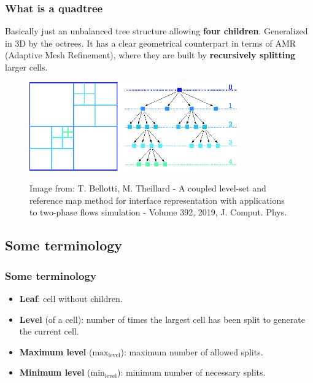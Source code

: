 \documentclass[8pt]{beamer}
\begin{document}
\begin{frame}

\frametitle{What is a quadtree}
\pause
Basically just an unbalanced tree structure allowing \textbf{four children}. Generalized in 3D by the octrees.
 \pause
 It has a clear geometrical counterpart in terms of AMR (Adaptive Mesh Refinement), where they are built by \textbf{recursively splitting} larger cells.
\begin{figure}[!h]
\begin{center}
\includegraphics[width=0.8\textwidth]{./figures/quadtree.eps}

\begin{tiny}
Image from: T. Bellotti, M. Theillard - A coupled level-set and reference map method for interface representation with applications to two-phase flows simulation - Volume 392, 2019, J. Comput. Phys.
\end{tiny}
\end{center}
\end{figure}
\end{frame}
\subsection{Some terminology}
\begin{frame}
 \frametitle{Some terminology}
 \pause
 \begin{itemize}
 \item \textbf{Leaf}: cell without children.\pause
  \item \textbf{Level} (of a cell): number of times the largest cell has been split to generate the current cell.\pause
  \item \textbf{Maximum level} ($\text{max}_{\text{level}}$): maximum number of allowed splits.
  \item \textbf{Minimum level} ($\text{min}_{\text{level}}$): minimum number of necessary splits.
 \end{itemize}

\end{frame}
\end{document}
